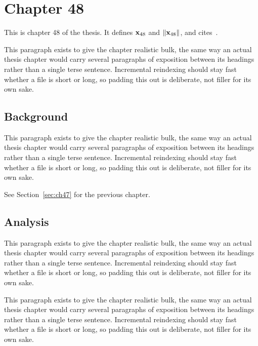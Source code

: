 \section{Chapter 48}
\label{sec:ch48}

This is chapter 48 of the thesis. It defines $\mathbf{x}_{48}$ and $\lVert \mathbf{x}_{48} \rVert$, and cites~\cite{ref1}.

This paragraph exists to give the chapter realistic bulk, the same way an actual thesis chapter would carry several paragraphs of exposition between its headings rather than a single terse sentence. Incremental reindexing should stay fast whether a file is short or long, so padding this out is deliberate, not filler for its own sake.

\subsection{Background}
\label{sec:ch48:background}

This paragraph exists to give the chapter realistic bulk, the same way an actual thesis chapter would carry several paragraphs of exposition between its headings rather than a single terse sentence. Incremental reindexing should stay fast whether a file is short or long, so padding this out is deliberate, not filler for its own sake.

See Section~\ref{sec:ch47} for the previous chapter.

\subsection{Analysis}
\label{sec:ch48:analysis}

This paragraph exists to give the chapter realistic bulk, the same way an actual thesis chapter would carry several paragraphs of exposition between its headings rather than a single terse sentence. Incremental reindexing should stay fast whether a file is short or long, so padding this out is deliberate, not filler for its own sake.

This paragraph exists to give the chapter realistic bulk, the same way an actual thesis chapter would carry several paragraphs of exposition between its headings rather than a single terse sentence. Incremental reindexing should stay fast whether a file is short or long, so padding this out is deliberate, not filler for its own sake.
